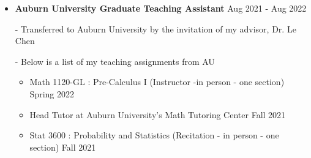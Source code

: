 \documentclass[letterpaper,12pt]{article}
\begin{document}
\begin{itemize}[itemsep = -0pt, topsep=0pt]
	\item \textbf{Auburn University Graduate Teaching Assistant} {\hfill Aug 2021 - Aug 2022} \\ \vspace{.05in}

	- Transferred to Auburn University by the invitation of my advisor, Dr. Le Chen \\  \vspace{.05in}

	- Below is a list of my teaching assignments from AU \\  \vspace{.05in}
		\begin{itemize}
			\item Math 1120-GL : Pre-Calculus I  (Instructor -in person - one section) \hfill Spring 2022 \\ \vspace{.05in}

			\item Head Tutor at Auburn University’s Math Tutoring Center \hfill Fall 2021 \\ \vspace{.05in}
			
			\item Stat 3600 : Probability and Statistics (Recitation - in person - one section)  \hfill Fall 2021 \\ \vspace{.05in}
		\end{itemize}
	
	

\end{itemize}
\end{document}
